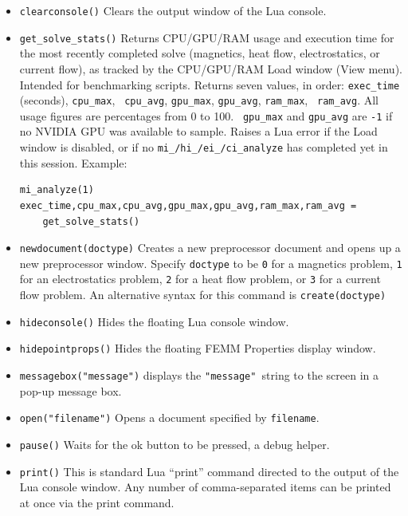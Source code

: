 \begin{itemize}

\item {\tt clearconsole()} Clears the output window of the Lua console.

\item {\tt get\_solve\_stats()} Returns CPU/GPU/RAM usage and execution
time for the most recently completed solve (magnetics, heat flow,
electrostatics, or current flow), as tracked by the CPU/GPU/RAM Load
window (View menu). Intended for benchmarking scripts. Returns seven
values, in order: {\tt exec\_time} (seconds), {\tt cpu\_max}, {\tt
cpu\_avg}, {\tt gpu\_max}, {\tt gpu\_avg}, {\tt ram\_max}, {\tt
ram\_avg}. All usage figures are percentages from 0 to 100. {\tt
gpu\_max} and {\tt gpu\_avg} are {\tt -1} if no NVIDIA GPU was
available to sample. Raises a Lua error if the Load window is
disabled, or if no {\tt mi\_/hi\_/ei\_/ci\_analyze} has completed yet
in this session. Example:
\begin{verbatim}
mi_analyze(1)
exec_time,cpu_max,cpu_avg,gpu_max,gpu_avg,ram_max,ram_avg =
    get_solve_stats()
\end{verbatim}

\item {\tt newdocument(doctype)} Creates a new preprocessor document
and opens up a new preprocessor window.  Specify {\tt doctype} to
be {\tt 0} for a magnetics problem, {\tt 1} for an electrostatics
problem, {\tt 2} for a heat flow problem, or {\tt 3} for a current
flow problem. An alternative syntax for this command is {\tt create(doctype)} 

\item{\tt hideconsole()} Hides the floating Lua console window.

\item{\tt hidepointprops()} Hides the floating FEMM Properties
display window.

\item \texttt{messagebox("message")} displays the \texttt{"message" }string to the
screen in a pop-up message box.

\item {\tt open("filename")} Opens a document specified by
{\tt filename}.

\item \texttt{pause()} Waits for the ok button to be pressed, a debug helper.

\item \texttt{print()} This is standard Lua ``print'' command directed to the
output of the Lua console window. Any number of comma-separated items can be
printed at once via the print command.


\end{itemize}
